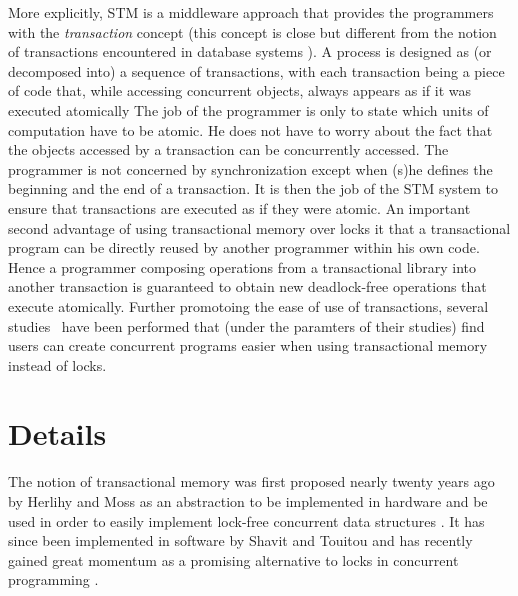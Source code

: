 More explicitly,  STM  is a middleware approach that provides the 
programmers  with the {\it transaction} concept (this concept 
is close but different from the notion of transactions encountered in 
database systems \cite{FFGH08,HCUAGSV07,HL08}).
 A process is designed as 
(or decomposed into)  a sequence of transactions, with each transaction 
being a piece  of code that, while  accessing  concurrent  objects, 
always  appears as if it was  executed atomically
The job of the programmer is only to state which  units of computation
have  to be atomic.  He does not have to worry about the fact that the 
objects accessed by  a transaction can be concurrently accessed. 
The programmer is not concerned by synchronization
except when (s)he defines the beginning and the end of a  transaction.
It  is then the job of the 
STM system to ensure that transactions are executed as if they were atomic. 
An important second advantage of using transactional memory over locks it that a transactional program
can be directly reused by another programmer within his own code.
Hence a programmer composing operations from a transactional library into another 
transaction is guaranteed to obtain new deadlock-free operations that execute atomically.
Further promotoing the ease of use of transactions, several studies~\cite{PA11,RHW10}
have been performed that (under the paramters of their studies) find users can create concurrent programs
easier when using transactional memory instead of locks.




\section{Details}
The notion  of   transactional  memory  was
first   proposed  nearly twenty years ago by Herlihy  and Moss 
as an abstraction to be implemented in hardware and be used in order to easily 
implement lock-free concurrent  data structures  \cite{HM93}.  It  has  since  been 
implemented in software  by Shavit  and  Touitou   \cite{ST97} and  has
recently gained great  momentum as  a promising alternative  to locks in
concurrent programming  \cite{FFGH08,H07,LK08,R08}.

